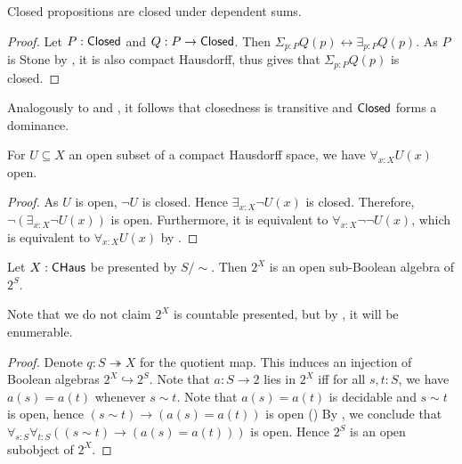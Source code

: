 \begin{corollary}\label{ClosedDependentSums}
  Closed propositions are closed under dependent sums. 
\end{corollary}
\begin{proof}
  Let $P:\mathsf{Closed}$ and $Q:P \to \mathsf{Closed}$. 
  Then $\Sigma_{p:P} Q(p) \leftrightarrow \exists_{p:P} Q(p)$.
  As $P$ is Stone by , it is also compact Hausdorff, thus
   gives that $\Sigma_{p:P} Q(p)$ is closed. 
\end{proof}
\begin{remark}
  Analogously to  and , it follows that 
  closedness is transitive and $\mathsf{Closed}$ forms a dominance. 
\end{remark}
\begin{corollary}\label{AllOpenSubspaceOpen}
  For $U\subseteq X$ an open subset of a compact Hausdorff space, we have 
  $\forall_{x:X} U(x)$ open. 
\end{corollary}
\begin{proof}
  As $U$ is open, $\neg U$ is closed. 
  Hence $\exists_{x:X} \neg U(x)$ is closed. 
  Therefore, $\neg (\exists_{x:X} \neg U(x))$ is open. 
  Furthermore, it is equivalent to $\forall_{x:X} \neg \neg U(x)$, 
  which is equivalent to $\forall_{x:X} U(x)$ by .
\end{proof}

\begin{lemma}
  Let $X:\mathsf{CHaus}$ be presented by $S/\sim$. 
  Then $2^X$ is an open sub-Boolean algebra of $2^S$. 
\end{lemma}
Note that we do not claim $2^X$ is countable presented, 
but by , it will be enumerable. 
\begin{proof}
  Denote $q:S \twoheadrightarrow X$ for the quotient map. 
  This induces an injection of Boolean algebras $2^X \hookrightarrow 2^S$.
  Note that $a:S\to 2$ lies in $2^X$ iff for all $s,t:S$, we have $a(s) = a(t)$ whenever $s\sim t$.
  Note that $a(s) = a(t)$ is decidable and $s\sim t$ is open, hence 
  $(s\sim t) \to (a(s) = a(t))$ is open ()
  By , we conclude that 
  $\forall_{s:S} \forall_{t:S} ((s\sim t) \to (a(s) = a(t)))$ is open. 
  Hence $2^S$ is an open subobject of $2^X$. 
\end{proof}
